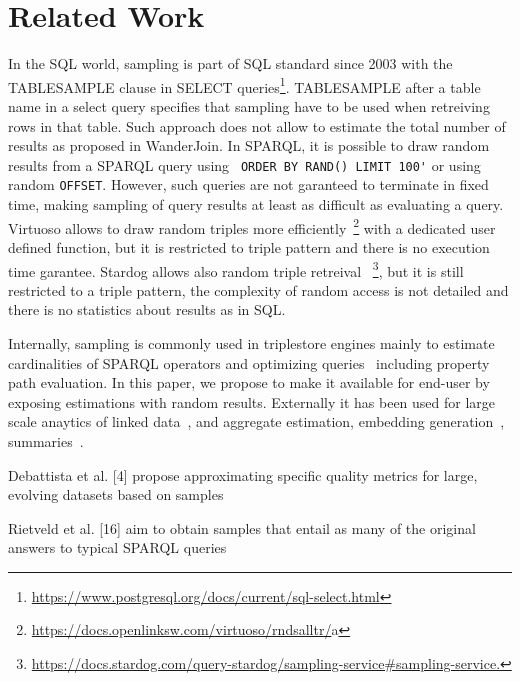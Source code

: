 

\section{Related Work}

In the SQL world, sampling is part of SQL standard since 2003 with the
TABLESAMPLE clause in SELECT
queries\footnote{\url{https://www.postgresql.org/docs/current/sql-select.html}}. TABLESAMPLE
after a table name in a select query specifies that sampling have to
be used when retreiving rows in that table. Such approach does not
allow to estimate the total number of results as proposed in
WanderJoin\cite{DBLP:journals/tods/LiWYZ19}.  In SPARQL, it is possible to draw random
results from a SPARQL query using \verb+ ORDER BY RAND() LIMIT 100'+
or using random \verb+OFFSET+. However, such queries are not garanteed
to terminate in fixed time, making sampling of query results at least as
difficult as evaluating a query. Virtuoso allows to draw
random triples more
efficiently~\footnote{\url{https://docs.openlinksw.com/virtuoso/rndsalltr/}a}
with a dedicated user defined function, but it is restricted to triple
pattern and there is no execution time garantee. Stardog allows also
random triple retreival
~\footnote{\url{https://docs.stardog.com/query-stardog/sampling-service\#sampling-service.}},
but it is still restricted to a triple pattern, the complexity of
random access is not detailed and there is no statistics about results
as in SQL.

Internally, sampling is commonly used in triplestore engines mainly to
estimate cardinalities of SPARQL operators and optimizing
queries~\cite{DBLP:conf/cidr/LeisRGK017} including property path evaluation\cite{10.1007/978-3-031-33455-9_3}. In this paper, we propose to
make it available for end-user by exposing estimations with random
results. Externally it has been used for large scale anaytics of
linked data~\cite{soulet2019anytime}, and aggregate
estimation\cite{li2016wanderjoin}, embedding
generation~\cite{ristoski2016rdf2vec}, summaries~\cite{10.1007/978-3-030-49461-2_10}.

Debattista et al. [4] propose approximating specific quality metrics
for large, evolving datasets based on
samples~\cite{10.1007/978-3-319-18818-8_14}

Rietveld et al. [16] aim to obtain samples that entail as many of the
original answers to typical SPARQL queries~\cite{10.1007/978-3-319-11915-1_6}



